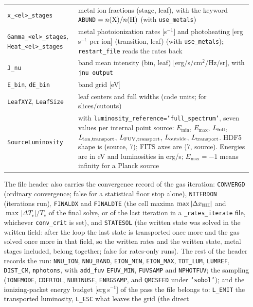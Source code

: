 \documentclass[english,a4paper]{my_memo}
\newcommand{\code}[1]{\texttt{#1}}
\begin{document}
\begin{center}
\begin{tabular}{lp{9.5cm}}
\code{x\_<el>\_stages} & metal ion fractions (stage, leaf), with the keyword \code{ABUND} $= n({\rm X})/n({\rm H})$ (with \code{use\_metals}) \\
\code{Gamma\_<el>\_stages}, \code{Heat\_<el>\_stages} & metal photoionization rates [s$^{-1}$] and photoheating [erg\,s$^{-1}$ per ion] (transition, leaf) (with \code{use\_metals}); \code{restart\_file} reads the rates back \\
\code{J\_nu} & band mean intensity (bin, leaf) [erg/s/cm$^2$/Hz/sr], with \code{jnu\_output} \\
\code{E\_bin}, \code{dE\_bin} & band grid [eV] \\
\code{LeafXYZ}, \code{LeafSize} & leaf centers and full widths (code units; for slices/cutouts) \\
\code{SourceLuminosity} & with \code{luminosity\_reference='full\_spectrum'}, seven values per internal point source: $E_{\min}$, $E_{\max}$, $L_{\rm full}$, $L_{\rm ion,transport}$, $L_{\rm FUV,transport}$, $L_{\rm outside}$, $L_{\rm transport}$.  HDF5 shape is (source, 7); FITS axes are (7, source).  Energies are in eV and luminosities in erg/s; $E_{\max}=-1$ means infinity for a Planck source \\
\bottomrule
\end{tabular}
\end{center}
The file header also carries the convergence record of the gas
iteration: \code{CONVERGD} (ordinary convergence; false for a statistical floor stop alone), \code{NITERDON}
(iterations run), \code{FINALDX} and \code{FINALDTE} (the cell maxima
$\max|\Delta x_{\rm HII}|$ and $\max|\Delta T_e|/T_e$ of the final
solve, or of the last iteration in a \code{\_rates\_iterate} file, whichever \code{conv\_crit} is set), and \code{STATESOL} (the
written state was solved in the written field: after the loop the last
state is transported once more and the gas solved once more in that
field, so the written rates and the written state, metal stages
included, belong together; false for rates-only runs).  The rest of the header records the run:
\code{NNU\_ION}, \code{NNU\_BAND}, \code{EION\_MIN}, \code{EION\_MAX},
\code{TOT\_LUM}, \code{LUMREF}, \code{DIST\_CM}, \code{nphotons}, with \code{add\_fuv}
\code{EFUV\_MIN}, \code{FUVSAMP} and \code{NPHOTFUV}; the sampling
(\code{IONEMODE}, \code{CDFRTOL}, \code{NUBINUSE}, \code{ENRGSAMP}, and
\code{QMCSEED} under \code{'sobol'}); and the ionizing-packet energy budget
[erg\,s$^{-1}$] of the pass the file belongs to: \code{L\_EMIT} the
transported luminosity, \code{L\_ESC} what leaves the grid (the direct
\end{document}
